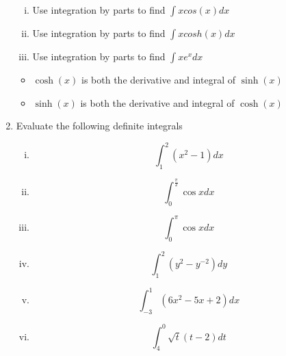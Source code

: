 \documentclass[a4paper,12pt]{article}
\begin{document}
\begin{enumerate}
\begin{enumerate}[(i)]
	\item Use integration by parts to find $\displaystyle{\int x cos(x) dx}$ 
	
	\item Use integration by parts to find $\displaystyle{\int x cosh(x) dx}$ 
	
	\item Use integration by parts to find $\displaystyle{\int xe^xdx}$ 
\end{enumerate}

\begin{framed}
	\begin{itemize}
		\item
		$\cosh(x)$ is both the derivative and integral of $\sinh(x)$
		
		\item
		$\sinh(x)$ is both the derivative and integral of $\cosh(x)$
	\end{itemize}
\end{framed}
\item 
Evaluate the following definite integrals 


\begin{multicols}{2}
	\begin{enumerate}[(i)]
		\item \[ \int^{2}_{1} (x^2-1) dx \]
		
		
		\item \[ \int^{\frac{\pi}{2}}_{0} \cos x dx \]
		
		\item \[ \int^{\pi}_{0} \cos x dx \]
		
		\item \[ \int^{2}_{1} (y^2 - y^{-2}) dy \]
		
		
		\item \[ \int^{1}_{-3} (6x^2 -5x + 2)dx \]
		
		
		
		
		\item \[ \int^0_4 \sqrt{t}(t-2) dt \]
		
		

\end{enumerate}
\end{multicols}
\end{enumerate}
\end{document}
